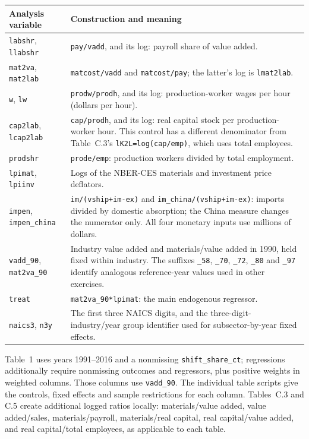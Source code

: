 \documentclass[11pt]{article}
\newcommand{\pkgfile}[1]{\nolinkurl{#1}}
\begin{document}
{\small
\begin{longtable}{@{}>{\raggedright\arraybackslash}p{3.0cm}
                    >{\raggedright\arraybackslash}p{11.8cm}@{}}
\toprule
\textbf{Analysis variable} & \textbf{Construction and meaning}\\
\midrule
\endhead
\pkgfile{labshr}, \pkgfile{llabshr}
 & \pkgfile{pay/vadd}, and its log: payroll share of value added.\\
\pkgfile{mat2va}, \pkgfile{mat2lab}
 & \pkgfile{matcost/vadd} and \pkgfile{matcost/pay}; the latter's log is
 \pkgfile{lmat2lab}.\\
\pkgfile{w}, \pkgfile{lw}
 & \pkgfile{prodw/prodh}, and its log: production-worker wages per hour
 (dollars per hour).\\
\pkgfile{cap2lab}, \pkgfile{lcap2lab}
 & \pkgfile{cap/prodh}, and its log: real capital stock per production-worker
 hour. This control has a different denominator from Table~C.3's
 \pkgfile{lK2L=log(cap/emp)}, which uses total employees.\\
\pkgfile{prodshr}
 & \pkgfile{prode/emp}: production workers divided by total employment.\\
\pkgfile{lpimat}, \pkgfile{lpiinv}
 & Logs of the NBER-CES materials and investment price deflators.\\
\pkgfile{impen}, \pkgfile{impen_china}
 & \pkgfile{im/(vship+im-ex)} and \pkgfile{im_china/(vship+im-ex)}:
 imports divided by domestic absorption; the China measure changes the
 numerator only. All four monetary inputs use millions of dollars.\\
\pkgfile{vadd_90}, \pkgfile{mat2va_90}
 & Industry value added and materials/value added in 1990, held fixed
 within industry. The suffixes \pkgfile{_58},
 \pkgfile{_70}, \pkgfile{_72}, \pkgfile{_80} and \pkgfile{_97}
 identify analogous reference-year values used in other exercises.\\
\pkgfile{treat}
 & \pkgfile{mat2va_90*lpimat}: the main endogenous regressor.\\
\pkgfile{naics3}, \pkgfile{n3y}
 & The first three NAICS digits, and the three-digit-industry/year group
 identifier used for subsector-by-year fixed effects.\\
\bottomrule
\end{longtable}}

Table~1 uses years 1991--2016 and a nonmissing
\pkgfile{shift_share_ct}; regressions additionally require nonmissing
outcomes and regressors, plus positive weights in weighted columns. Those columns use
\pkgfile{vadd_90}. The individual table scripts give the controls, fixed
effects and sample restrictions for each column. Tables~C.3 and C.5 create
additional logged ratios locally: materials/value added, value added/sales,
materials/payroll, materials/real capital, real capital/value added, and
real capital/total employees, as applicable to each table.
\end{document}
